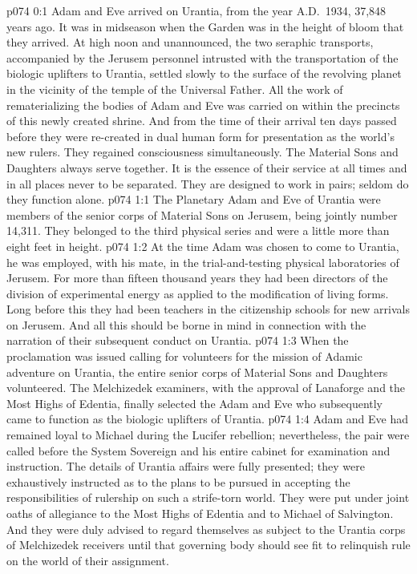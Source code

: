 \author{Solonia}
\vs p074 0:1 Adam and Eve arrived on Urantia, from the year A.D.~1934, 37,848 years ago. It was in midseason when the Garden was in the height of bloom that they arrived. At high noon and unannounced, the two seraphic transports, accompanied by the Jerusem personnel intrusted with the transportation of the biologic uplifters to Urantia, settled slowly to the surface of the revolving planet in the vicinity of the temple of the Universal Father. All the work of rematerializing the bodies of Adam and Eve was carried on within the precincts of this newly created shrine. And from the time of their arrival ten days passed before they were re\hyp{}created in dual human form for presentation as the world’s new rulers. They regained consciousness simultaneously. The Material Sons and Daughters always serve together. It is the essence of their service at all times and in all places never to be separated. They are designed to work in pairs; seldom do they function alone.
\vs p074 1:1 The Planetary Adam and Eve of Urantia were members of the senior corps of Material Sons on Jerusem, being jointly number 14,311. They belonged to the third physical series and were a little more than eight feet in height.
\vs p074 1:2 At the time Adam was chosen to come to Urantia, he was employed, with his mate, in the trial\hyp{}and\hyp{}testing physical laboratories of Jerusem. For more than fifteen thousand years they had been directors of the division of experimental energy as applied to the modification of living forms. Long before this they had been teachers in the citizenship schools for new arrivals on Jerusem. And all this should be borne in mind in connection with the narration of their subsequent conduct on Urantia.
\vs p074 1:3 When the proclamation was issued calling for volunteers for the mission of Adamic adventure on Urantia, the entire senior corps of Material Sons and Daughters volunteered. The Melchizedek examiners, with the approval of Lanaforge and the Most Highs of Edentia, finally selected the Adam and Eve who subsequently came to function as the biologic uplifters of Urantia.
\vs p074 1:4 Adam and Eve had remained loyal to Michael during the Lucifer rebellion; nevertheless, the pair were called before the System Sovereign and his entire cabinet for examination and instruction. The details of Urantia affairs were fully presented; they were exhaustively instructed as to the plans to be pursued in accepting the responsibilities of rulership on such a strife\hyp{}torn world. They were put under joint oaths of allegiance to the Most Highs of Edentia and to Michael of Salvington. And they were duly advised to regard themselves as subject to the Urantia corps of Melchizedek receivers until that governing body should see fit to relinquish rule on the world of their assignment.
